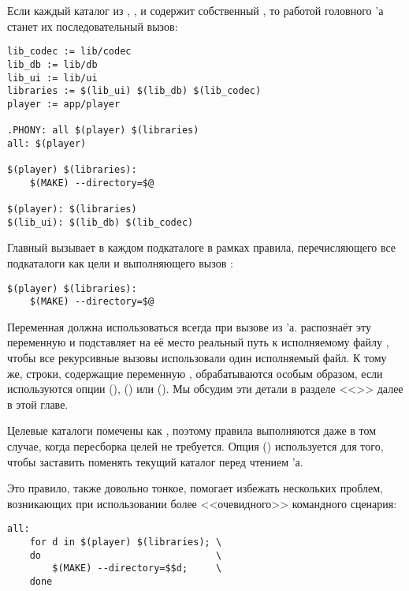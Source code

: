 Если каждый каталог из , ,
 и  содержит собственный
\Makefile{}, то работой головного \Makefile{}'а станет их
последовательный вызов:

{\footnotesize
\begin{verbatim}
lib_codec := lib/codec
lib_db := lib/db
lib_ui := lib/ui
libraries := $(lib_ui) $(lib_db) $(lib_codec)
player := app/player

.PHONY: all $(player) $(libraries)
all: $(player)

$(player) $(libraries):
    $(MAKE) --directory=$@

$(player): $(libraries)
$(lib_ui): $(lib_db) $(lib_codec)
\end{verbatim}
}

Главный \Makefile{} вызывает \GNUmake{} в каждом подкаталоге в рамках
правила, перечисляющего все подкаталоги как цели и выполняющего вызов
\GNUmake{}:

{\footnotesize
\begin{verbatim}
$(player) $(libraries):
    $(MAKE) --directory=$@
\end{verbatim}
}

Переменная  должна использоваться всегда при вызове
\GNUmake{} из \Makefile{}'а. \GNUmake{} распознаёт эту переменную и
подставляет на её место реальный путь к исполняемому файлу \GNUmake{},
чтобы все рекурсивные вызовы \GNUmake{} использовали один исполняемый
файл. К тому же, строки, содержащие переменную ,
обрабатываются особым образом, если используются опции 
(),  () или
 (). Мы обсудим эти детали в
разделе <<>> далее в этой главе.

Целевые каталоги помечены как , поэтому правила
выполняются даже в том случае, когда пересборка целей не
требуется. Опция  ()
используется для того, чтобы заставить \GNUmake{} поменять текущий
каталог перед чтением \Makefile{}'а.

Это правило, также довольно тонкое, помогает избежать нескольких
проблем, возникающих при использовании более <<очевидного>> командного
сценария:

{\footnotesize
\begin{verbatim}
all:
    for d in $(player) $(libraries); \
    do                               \ 
        $(MAKE) --directory=$$d;     \
    done
\end{verbatim}
}

